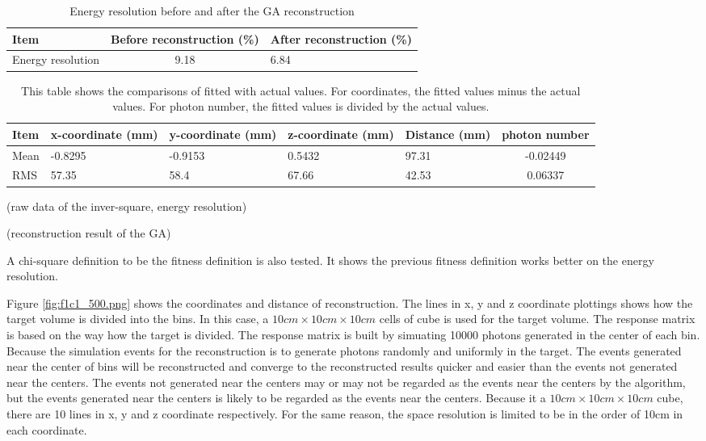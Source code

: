 \begin{table}
\centering
\caption{Energy resolution before and after the GA reconstruction}
\label{tab:GAISSim}
\begin{tabular}{lcp{5.0cm}}
\hline
Item & Before reconstruction (\%) & After reconstruction (\%) \\
\hline
\hline
Energy resolution & 9.18 & 6.84 \\
\hline
\end{tabular}
\end{table}


\begin{table}
\centering
\caption[Summary of the actual and fitted coordinates and photon number]
{
This table shows the comparisons of fitted with actual values.
For coordinates, the fitted values minus the actual values.
For photon number, the fitted values is divided by the actual values.
}
\label{tab:GACoorPhoton}
\begin{tabular}{lp{2.5cm}p{2.5cm}p{2.5cm}p{2.5cm}c}
\hline
Item &  x-coordinate (mm) & y-coordinate (mm) & z-coordinate (mm) & Distance (mm) & photon number \\
\hline
\hline
Mean        &   -0.8295 &   -0.9153 &   0.5432  &   97.31   &   -0.02449    \\
RMS         &   57.35   &   58.4    &   67.66   &   42.53   &   0.06337     \\
\hline
\end{tabular}
\end{table}



(raw data of the inver-square, energy resolution)




(reconstruction result of the GA)


A chi-square definition to be the fitness definition is also tested.
It shows the previous fitness definition works better on the
energy resolution.


Figure \ref{fig:f1c1_500.png} shows the coordinates and distance of reconstruction.
The lines in x, y and z coordinate plottings shows how the target volume is divided into the bins.
In this case, a $10cm\times10cm\times10cm$ cells of cube is used for the target volume. The response matrix
is based on the way how the target is divided. The response matrix is built by simuating 10000 photons
generated in the center of each bin. Because the simulation events for the reconstruction is to generate
photons randomly and uniformly in the target. The events generated near the center of bins will be reconstructed
and converge to the reconstructed results quicker and easier than the events not generated near the centers.
The events not generated near the centers may or may not be regarded as the events near the centers by the algorithm,
but the events generated near the centers is likely to be regarded as the events near the centers.
Because it a $10cm\times10cm\times10cm$ cube, there are 10 lines in x, y and z coordinate respectively.
For the same reason, the space resolution is limited to be in the order of 10cm in each coordinate.

